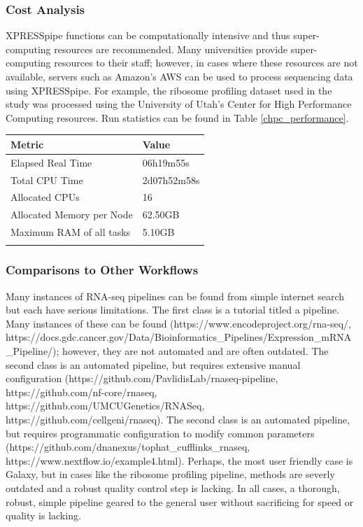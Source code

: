 \documentclass[11pt, a4paper, oneside]{article}
\begin{document}
\subsubsection{Cost Analysis}
XPRESSpipe functions can be computationally intensive and thus super-computing resources are recommended. Many universities provide super-computing resources to their staff; however, in cases where these resources are not available, servers such as Amazon's AWS can be used to process sequencing data using XPRESSpipe. For example, the ribosome profiling dataset used in the study was processed using the University of Utah's Center for High Performance Computing resources. Run statistics can be found in Table \ref{chpc_performance}.

\begin{tabular}{p{5cm}p{3cm}}
\textbf{Metric} & \textbf{Value} \\
\hline
 Elapsed Real Time & 06h19m55s \\
 \hline
 Total CPU Time & 2d07h52m58s  \\
 \hline
 Allocated CPUs & 16 \\
 \hline
 Allocated Memory per Node & 62.50GB \\
 \hline
 Maximum RAM of all tasks & 5.10GB \\
 \label{tab:chpc_performance}
\end{tabular}
\newline

\subsubsection{Comparisons to Other Workflows}
Many instances of RNA-seq pipelines can be found from simple internet search but each have serious limitations. The first class is a tutorial titled a pipeline. Many instances of these can be found (https://www.encodeproject.org/rna-seq/, https://docs.gdc.cancer.gov/Data/Bioinformatics\_Pipelines/Expression\_mRNA\_Pipeline/); however, they are not automated and are often outdated. The second class is an automated pipeline, but requires extensive manual configuration (https://github.com/PavlidisLab/rnaseq-pipeline, https://github.com/nf-core/rnaseq, https://github.com/UMCUGenetics/RNASeq, https://github.com/cellgeni/rnaseq). The second class is an automated pipeline, but requires programmatic configuration to modify common parameters (https://github.com/dnanexus/tophat\_cufflinks\_rnaseq, https://www.nextflow.io/example4.html). Perhaps, the most user friendly case is Galaxy, but in cases like the ribosome profiling pipeline, methods are severly outdated and a robust quality control step is lacking. In all cases, a thorough, robust, simple pipeline geared to the general user without sacrificing for speed or quality is lacking.
\end{document}
